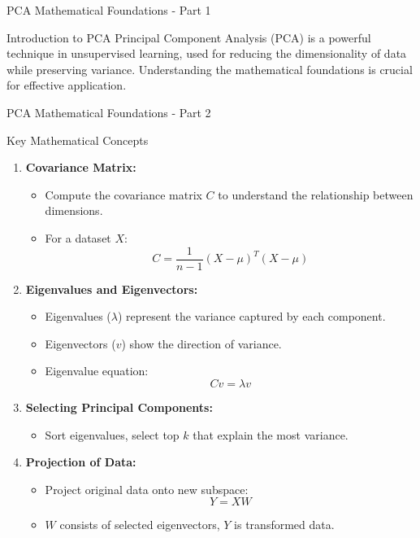 \documentclass[aspectratio=169]{beamer}
\begin{document}
\begin{frame}[fragile]{PCA Mathematical Foundations - Part 1}
  \begin{block}{Introduction to PCA}
    Principal Component Analysis (PCA) is a powerful technique in unsupervised learning, used for reducing the dimensionality of data while preserving variance.
    Understanding the mathematical foundations is crucial for effective application.
  \end{block}
\end{frame}

\begin{frame}[fragile]{PCA Mathematical Foundations - Part 2}
  \begin{block}{Key Mathematical Concepts}
    \begin{enumerate}
      \item \textbf{Covariance Matrix:}
        \begin{itemize}
          \item Compute the covariance matrix \(C\) to understand the relationship between dimensions.
          \item For a dataset \(X\):
          \begin{equation}
          C = \frac{1}{n-1} (X - \mu)^{T}(X - \mu)
          \end{equation}
        \end{itemize}
        
      \item \textbf{Eigenvalues and Eigenvectors:}
        \begin{itemize}
          \item Eigenvalues (\(\lambda\)) represent the variance captured by each component.
          \item Eigenvectors (\(v\)) show the direction of variance.
          \item Eigenvalue equation:
          \begin{equation}
          Cv = \lambda v
          \end{equation}
        \end{itemize}
        
      \item \textbf{Selecting Principal Components:}
        \begin{itemize}
          \item Sort eigenvalues, select top \(k\) that explain the most variance.
        \end{itemize}
        
      \item \textbf{Projection of Data:}
        \begin{itemize}
          \item Project original data onto new subspace:
          \begin{equation}
          Y = XW
          \end{equation}
          \item \(W\) consists of selected eigenvectors, \(Y\) is transformed data.
        \end{itemize}
    \end{enumerate}
  \end{block}
\end{frame}
\end{document}
